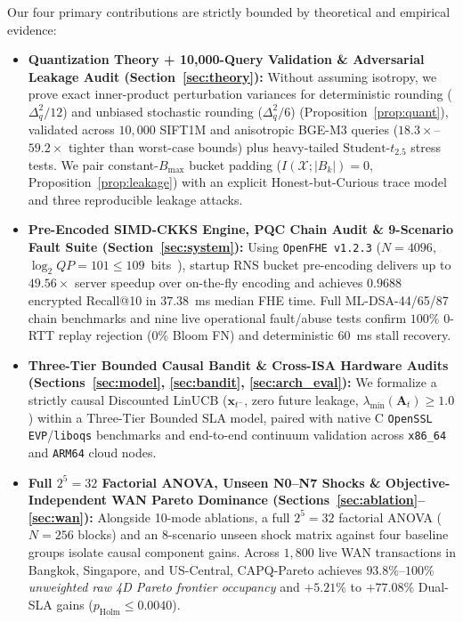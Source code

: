 \documentclass[10pt,journal,compsoc]{IEEEtran}
\begin{document}
Our four primary contributions are strictly bounded by theoretical and empirical evidence:
\begin{itemize}
    \item \textbf{Quantization Theory + 10,000-Query Validation \& Adversarial Leakage Audit (Section~\ref{sec:theory}):} Without assuming isotropy, we prove exact inner-product perturbation variances for deterministic rounding ($\Delta_q^2/12$) and unbiased stochastic rounding ($\Delta_q^2/6$) (Proposition~\ref{prop:quant}), validated across $10,000$ SIFT1M and anisotropic BGE-M3 queries ($18.3\times$--$59.2\times$ tighter than worst-case bounds) plus heavy-tailed $\text{Student-}t_{2.5}$ stress tests. We pair constant-$B_{\max}$ bucket padding ($I(\mathcal{X};|B_k|)=0$, Proposition~\ref{prop:leakage}) with an explicit Honest-but-Curious trace model and three reproducible leakage attacks.
    \item \textbf{Pre-Encoded SIMD-CKKS Engine, PQC Chain Audit \& 9-Scenario Fault Suite (Section~\ref{sec:system}):} Using \texttt{OpenFHE v1.2.3} ($N=4096$, $\log_2 QP = 101 \le 109$~bits~\cite{albrecht2021hestandard}), startup RNS bucket pre-encoding delivers up to $49.56\times$ server speedup over on-the-fly encoding and achieves $0.9688$ encrypted Recall@10 in $37.38$~ms median FHE time. Full ML-DSA-44/65/87 chain benchmarks and nine live operational fault/abuse tests confirm $100\%$ 0-RTT replay rejection ($0\%$ Bloom FN) and deterministic $60$~ms stall recovery.
    \item \textbf{Three-Tier Bounded Causal Bandit \& Cross-ISA Hardware Audits (Sections~\ref{sec:model}, \ref{sec:bandit}, \ref{sec:arch_eval}):} We formalize a strictly causal Discounted LinUCB ($\mathbf{x}_{t^-}$, zero future leakage, $\lambda_{\min}(\mathbf{A}_t) \ge 1.0$) within a Three-Tier Bounded SLA model, paired with native C \texttt{OpenSSL EVP}/\texttt{liboqs} benchmarks and end-to-end continuum validation across \texttt{x86\_64} and \texttt{ARM64} cloud nodes.
    \item \textbf{Full $2^5=32$ Factorial ANOVA, Unseen N0--N7 Shocks \& Objective-Independent WAN Pareto Dominance (Sections~\ref{sec:ablation}--\ref{sec:wan}):} Alongside 10-mode ablations, a full $2^5=32$ factorial ANOVA ($N=256$ blocks) and an 8-scenario unseen shock matrix against four baseline groups isolate causal component gains. Across $1,800$ live WAN transactions in Bangkok, Singapore, and US-Central, CAPQ-Pareto achieves $93.8\%$--$100\%$ \emph{unweighted raw 4D Pareto frontier occupancy} and $+5.21\%$ to $+77.08\%$ Dual-SLA gains ($p_{\mathrm{Holm}} \le 0.0040$).
\end{itemize}
\end{document}
